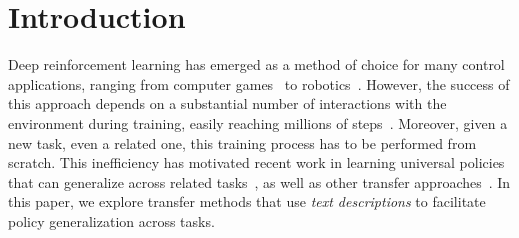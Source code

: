 \section{Introduction}
\label{sec:introduction}


Deep reinforcement learning has emerged as a method of choice for many control applications, ranging from computer games~\cite{mnih2015dqn,silver2016mastering} to robotics~. However, the success of this approach depends on a substantial number of interactions with the environment during training, easily reaching millions of steps~\cite{nair2015massively,mnih2016asynchronous}. Moreover, given a new task, even a related one, this training process has to be performed from scratch. This inefficiency has motivated recent work in learning universal policies that can generalize across related tasks~, as well as other transfer approaches~.  In this paper, we explore transfer methods that use \emph{text descriptions} to facilitate policy generalization across tasks.


